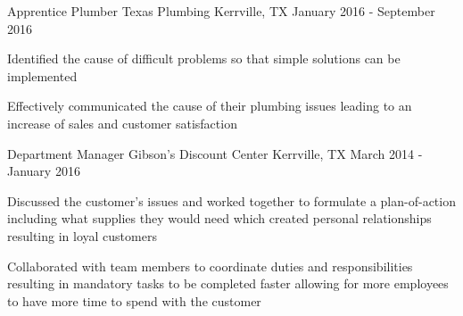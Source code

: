 \begin{cventries}
          \cventry
            {Apprentice Plumber} %
            {Texas Plumbing} %
            {Kerrville, TX} %
            {January 2016 - September 2016} %
            {
              \begin{cvitems} %
                \item {Identified the cause of difficult problems so that simple solutions can be implemented}
                \item {Effectively communicated the cause of their plumbing issues leading to an increase of sales and customer satisfaction}
              \end{cvitems}
            }

          \cventry
            {Department Manager} %
            {Gibson's Discount Center} %
            {Kerrville, TX} %
            {March 2014 - January 2016} %
            {
              \begin{cvitems} %
                \item {Discussed the customer's issues and worked together to formulate a plan-of-action including what supplies they would need which created personal relationships resulting in loyal customers}
                \item {Collaborated with team members to coordinate duties and responsibilities resulting in mandatory tasks to be completed faster allowing for more employees to have more time to spend with the customer}
              \end{cvitems}
            }
    \end{cventries}
